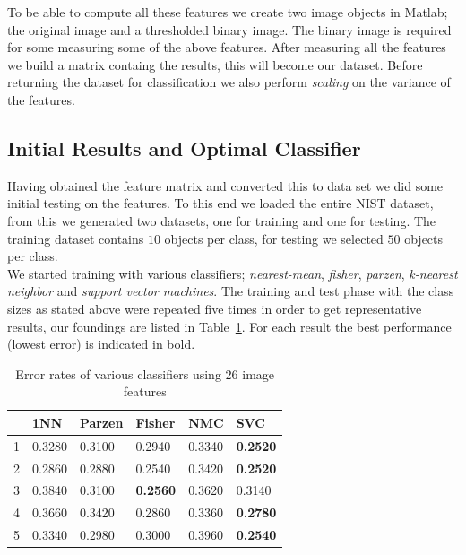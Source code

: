 \documentclass{article}
\begin{document}
To be able to compute all these features we create two image objects in Matlab; the original image and a thresholded binary image. The binary image is required for some measuring some of the above features. After measuring all the features we build a matrix containg the results, this will become our dataset. Before returning the dataset for classification we also perform \emph{scaling} on the variance of the features.

\subsection{Initial Results and Optimal Classifier}

Having obtained the feature matrix and converted this to data set we did some initial testing on the features. To this end we loaded the entire NIST dataset, from this we generated two datasets, one for training and one for testing. The training dataset contains $10$ objects per class, for testing we selected $50$ objects per class. \\

We started training with various classifiers; \emph{nearest-mean}, \emph{fisher}, \emph{parzen}, \emph{k-nearest neighbor} and \emph{support vector machines}. The training and test phase with the class sizes as stated above were repeated five times in order to get representative results, our foundings are listed in Table~\ref{table:results-only-features}. For each result the best performance (lowest error) is indicated in bold. 

\begin{table}[H]
	\centering
    \begin{tabular}{|l|lllll|}
    \hline
	& \textbf{1NN} & \textbf{Parzen} & \textbf{Fisher} & \textbf{NMC} & \textbf{SVC} \\
	\hline
	1 & 0.3280 &  0.3100 &   0.2940 &   0.3340 &   \textbf{0.2520} \\
	2 & 0.2860 &  0.2880 &   0.2540 &   0.3420 &   \textbf{0.2520} \\		
	3 & 0.3840 &  0.3100 &   \textbf{0.2560} &   0.3620 &   0.3140 \\	
	4 & 0.3660 &  0.3420 &   0.2860 &   0.3360 &   \textbf{0.2780} \\
	5 & 0.3340 &  0.2980 &   0.3000 &   0.3960 &   \textbf{0.2540} \\
	\hline
    \end{tabular}
    \caption{Error rates of various classifiers using $26$ image features \label{table:results-only-features}}
\end{table}
\end{document}
